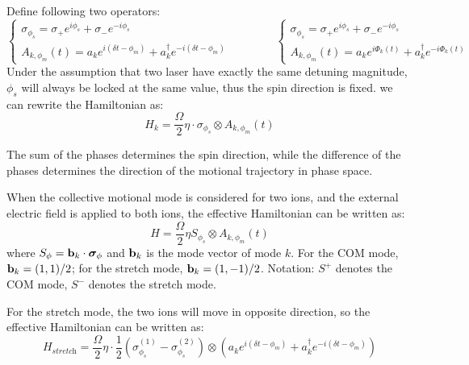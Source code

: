 \documentclass{simple-notes}
\begin{document}
Define following two operators:
\begin{equation}
    \begin{cases}
        \sigma_{\phi_s} = \sigma_+ e^{i\phi_s} + \sigma_- e^{-i\phi_s} \\
        A_{k, \phi_m}(t) = a_k e^{i(\delta t - \phi_m)} + a_k^\dagger e^{-i(\delta t - \phi_m)}
    \end{cases}\qquad \qquad 
    \begin{cases}
        \sigma_{\phi_s} = \sigma_+ e^{i\phi_s} + \sigma_- e^{-i\phi_s} \\
        A_{k, \phi_m}(t) = a_k e^{i\Phi_k(t)} + a_k^\dagger e^{-i\Phi_k(t)}
    \end{cases}
\end{equation}
Under the assumption that two laser have exactly the same detuning magnitude, $\phi_s$ will always be locked at the same value, thus the spin direction is fixed.  
we can rewrite the Hamiltonian as:
\begin{equation}
        H_k = \frac{\Omega}{2} \eta \cdot\sigma_{\phi_s}\otimes A_{k, \phi_m}(t) \tag{Effective Hamiltonian for bichromatic laser coupling}
\end{equation}


The sum of the phases determines the spin direction, while the difference of the phases determines the direction of the motional trajectory in phase space.

When the collective motional mode is considered for two ions, and the external electric field is applied to both ions, the effective Hamiltonian can be written as:
\begin{equation}
    H = \frac{\Omega}{2} \eta S_{\phi_s} \otimes A_{k, \phi_m}(t) \tag{Effective Hamiltonian for bichromatic laser coupling with two ions}
\end{equation}
where $S_\phi = \vb b_k \cdot \vb*\sigma_\phi$ and $\vb b_k$ is the mode vector of mode $k$. For the COM mode, $\vb b_k = (1,1)/2$; for the stretch mode, $\vb b_k = (1,-1)/2$. Notation: $S^+$ denotes the COM mode, $S^-$ denotes the stretch mode.

For the stretch mode, the two ions will move in opposite direction, so the effective Hamiltonian can be written as:
\begin{equation}
    H_{\textit{stretch}} = \frac{\Omega}{2} \eta \cdot \frac{1}{2}(\sigma_{\phi_s}^{(1)} - \sigma_{\phi_s}^{(2)}) \otimes (a_k e^{i(\delta t - \phi_m)} + a_k^\dagger e^{-i(\delta t - \phi_m)})
\end{equation}
\end{document}
